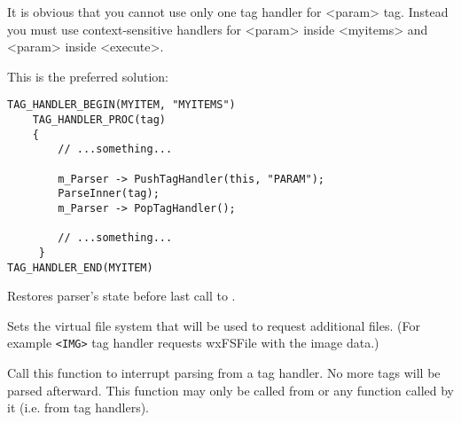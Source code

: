 It is obvious that you cannot use only one tag handler for <param> tag.
Instead you must use context-sensitive handlers for <param> inside <myitems>
and <param> inside <execute>.        

This is the preferred solution:

\begin{verbatim}
TAG_HANDLER_BEGIN(MYITEM, "MYITEMS")
    TAG_HANDLER_PROC(tag)
    {
        // ...something...

        m_Parser -> PushTagHandler(this, "PARAM");
        ParseInner(tag);
        m_Parser -> PopTagHandler();

        // ...something...
     }
TAG_HANDLER_END(MYITEM)
\end{verbatim}


\label{wxhtmlparserpoptaghandler}


Restores parser's state before last call to 
.


\label{wxhtmlparsersetfs}


Sets the virtual file system that will be used to request additional
files. (For example {\tt <IMG>} tag handler requests wxFSFile with the
image data.)

\label{wxhtmlparserstopparsing}


Call this function to interrupt parsing from a tag handler. No more tags
will be parsed afterward. This function may only be called from
 or any function called
by it (i.e. from tag handlers).

